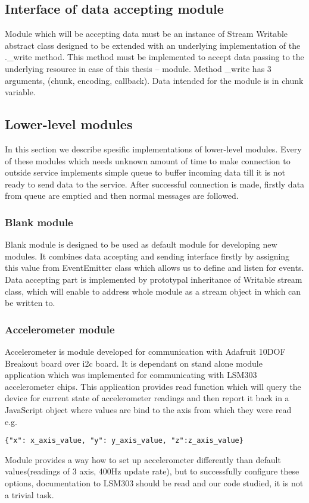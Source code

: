 \subsection{Interface of data accepting module} %
\label{ssub:interface_of_data_accepting_module}
Module which will be accepting data must be an instance of Stream Writable abstract class designed to be extended with an underlying implementation of the .\_write method. This method must be implemented to accept data passing to the underlying resource in case of this thesis -- module. Method \_write  has 3 arguments, (chunk, encoding, callback). Data intended for the module is in chunk variable.
\subsection{Lower-level modules} %
\label{sub:lower_level_modules}
In this section we describe spesific implementations of lower-level modules. Every of these modules which needs unknown amount of time to make connection to outside service implements simple queue to buffer incoming data till it is not ready to send data to the service. After successful connection is made, firstly data from queue are emptied and then normal messages are followed.
\subsubsection{Blank module} %
\label{ssub:blank_module}
Blank module is designed to be used as default module for developing new modules. It combines data accepting and sending interface firstly by assigning this value from EventEmitter class which allows us to define and listen for events. Data accepting part is implemented by prototypal inheritance of Writable stream class, which will enable to address whole module as a stream object in which can be written to.
\subsubsection{Accelerometer module} %
\label{ssub:accelerometer_module}
Accelerometer is module developed for communication with Adafruit 10DOF Breakout board over \gls{i2c} board. It is dependant on stand alone module application which was implemented for communicating with LSM303 accelerometer chips. This application provides read function which will query the device for current state of accelerometer readings and then report it back in a JavaScript object where values are bind to the axis from which they were read e.g.
\begin{verbatim}{"x": x_axis_value, "y": y_axis_value, "z":z_axis_value}\end{verbatim}
Module provides a way how to set up accelerometer differently than default values(readings of 3 axis, 400Hz update rate), but to successfully configure these options, documentation to LSM303 should be read and our code studied, it is not a trivial task.
